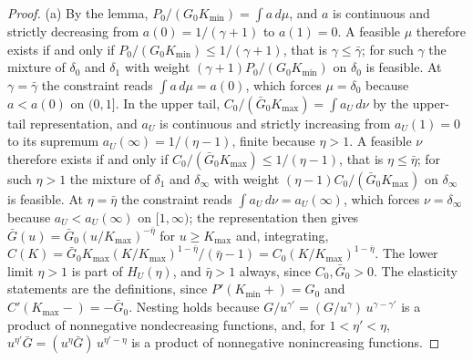 \documentclass[11pt]{article}
\theoremstyle{remark}
\begin{document}
\begin{proof}
(a) By the lemma, $P_0/(G_0K_{\min})=\int a\,d\mu$, and $a$ is continuous and strictly decreasing from $a(0)=1/(\gamma+1)$ to $a(1)=0$. A feasible $\mu$ therefore exists if and only if $P_0/(G_0K_{\min})\le1/(\gamma+1)$, that is $\gamma\le\bar\gamma$; for such $\gamma$ the mixture of $\delta_0$ and $\delta_1$ with weight $(\gamma+1)P_0/(G_0K_{\min})$ on $\delta_0$ is feasible. At $\gamma=\bar\gamma$ the constraint reads $\int a\,d\mu=a(0)$, which forces $\mu=\delta_0$ because $a<a(0)$ on $(0,1]$. In the upper tail, $C_0/(\bar G_0K_{\max})=\int a_U\,d\nu$ by the upper-tail representation, and $a_U$ is continuous and strictly increasing from $a_U(1)=0$ to its supremum $a_U(\infty)=1/(\eta-1)$, finite because $\eta>1$. A feasible $\nu$ therefore exists if and only if $C_0/(\bar G_0K_{\max})\le1/(\eta-1)$, that is $\eta\le\bar\eta$; for such $\eta>1$ the mixture of $\delta_1$ and $\delta_\infty$ with weight $(\eta-1)C_0/(\bar G_0K_{\max})$ on $\delta_\infty$ is feasible. At $\eta=\bar\eta$ the constraint reads $\int a_U\,d\nu=a_U(\infty)$, which forces $\nu=\delta_\infty$ because $a_U<a_U(\infty)$ on $[1,\infty)$; the representation then gives $\bar G(u)=\bar G_0(u/K_{\max})^{-\bar\eta}$ for $u\ge K_{\max}$ and, integrating, $C(K)=\bar G_0K_{\max}(K/K_{\max})^{1-\bar\eta}/(\bar\eta-1)=C_0(K/K_{\max})^{1-\bar\eta}$. The lower limit $\eta>1$ is part of $H_U(\eta)$, and $\bar\eta>1$ always, since $C_0,\bar G_0>0$. The elasticity statements are the definitions, since $P'(K_{\min}+)=G_0$ and $C'(K_{\max}-)=-\bar G_0$. Nesting holds because $G/u^{\gamma'}=(G/u^\gamma)\,u^{\gamma-\gamma'}$ is a product of nonnegative nondecreasing functions, and, for $1<\eta'<\eta$, $u^{\eta'}\bar G=(u^\eta\bar G)\,u^{\eta'-\eta}$ is a product of nonnegative nonincreasing functions.


\end{proof}
\end{document}
